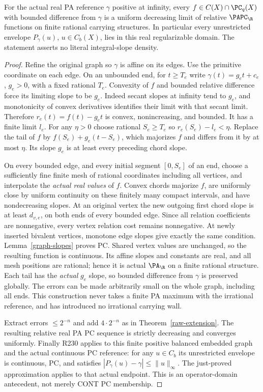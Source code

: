 \begin{theorem}\label{graph-density}
For the actual real PA reference $\gamma$ positive at infinity, every
$f\in C(X)\cap\PC_q(X)$ with bounded difference from $\gamma$ is a
uniform decreasing limit of relative $\PAPC_\R$ functions on finite
rational carrying structures. In particular every unrestricted envelope
$P_\gamma(u)$, $u\in C_b(X)$, lies in this real regularizable domain.
The statement asserts no literal integral-slope density.
\end{theorem}
\begin{proof}
Refine the original graph so $\gamma$ is affine on its edges. Use the
primitive coordinate on each edge. On an unbounded end, for $t\geq T_e$
write $\gamma(t)=g_et+c_e$, $g_e>0$, with a fixed rational $T_e$.
Convexity of $f$ and bounded relative difference force its limiting
slope to be $g_e$. Indeed secant slopes at infinity tend to $g_e$,
and monotonicity of convex derivatives identifies their limit with
that secant limit. Therefore $r_e(t)=f(t)-g_et$ is convex,
nonincreasing, and bounded. It has a finite limit $l_e$.
For any $\eta>0$ choose rational $S_e\geq T_e$ so
$r_e(S_e)-l_e<\eta$. Replace the tail of $f$ by
$f(S_e)+g_e(t-S_e)$, which majorizes $f$ and differs from it by at
most $\eta$. Its slope $g_e$ is at least every preceding chord slope.

On every bounded edge, and every initial segment $[0,S_e]$ of an end,
choose a sufficiently fine finite mesh of rational coordinates including
all vertices, and interpolate the \emph{actual real values} of $f$.
Convex chords majorize $f$, are uniformly close by uniform continuity
on these finitely many compact intervals, and have nondecreasing slopes.
At an original vertex the new outgoing first chord slope is at least
$d_{v,e}$, on both ends of every bounded edge. Since all relation
coefficients are nonnegative, every vertex relation cost remains
nonnegative. At newly inserted bivalent vertices, monotone edge slopes
give exactly the same condition. Lemma~\ref{graph-slopes} proves PC.
Shared vertex values are unchanged, so the resulting function is
continuous. Its affine slopes and constants are real, and all mesh
positions are rational; hence it is actual $\PA_\R$ on a finite
rational structure. Each tail has the \emph{actual} $g_e$ slope,
so bounded difference from $\gamma$ is preserved globally.
The errors can be made arbitrarily small on the whole graph, including
all ends. This construction never takes a finite PA maximum with the
irrational reference, and has introduced no irrational carrying wall.

Extract errors $\leq2^{-n}$ and add $4\cdot2^{-n}$ as in
Theorem~\ref{raw-extension}. The resulting relative real PA PC sequence
is strictly decreasing and converges uniformly. Finally R230 applies
to this finite positive balanced embedded graph and the actual
continuous PC reference: for any $u\in C_b$ its unrestricted envelope
is continuous, PC, and satisfies $|P_\gamma(u)-\gamma|\leq\|u\|_\infty$.
The just-proved approximation applies to that actual endpoint. This is
an operator-domain antecedent, not merely CONT PC membership.
\end{proof}

